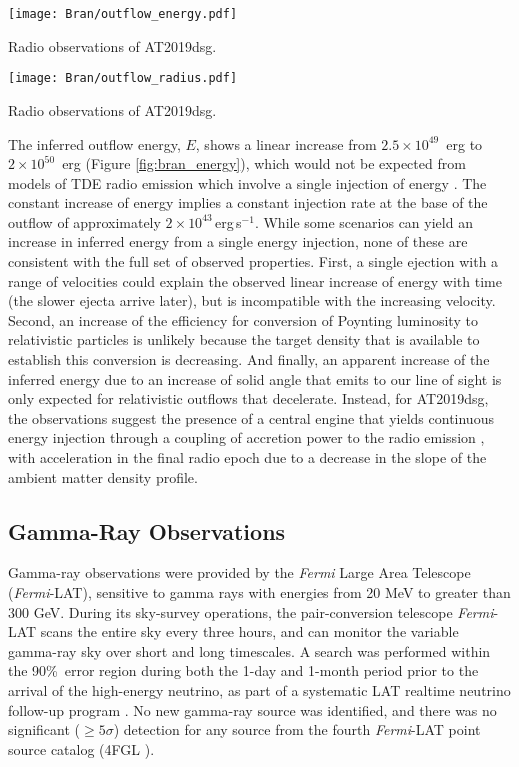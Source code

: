 \begin{marginfigure}
	\texttt{[image: Bran/outflow\_energy.pdf]}
	\caption{Radio observations of AT2019dsg.}
	\label{fig:bran_energy}
\end{marginfigure}

\begin{marginfigure}
	\texttt{[image: Bran/outflow\_radius.pdf]}
	\caption{Radio observations of AT2019dsg.}
	\label{fig:bran_radius}
\end{marginfigure}

The inferred outflow energy, $E$, shows a linear increase from $2.5 \times 10^{49}$~erg to $2 \times 10^{50}$~erg (Figure \ref{fig:bran_energy}), which would not be expected from models of TDE radio emission which involve a single injection of energy . The constant increase of energy implies a constant injection rate at the base of the outflow of approximately $2\times10^{43}$\,erg\,s$^{-1}$. While some scenarios can yield an increase in inferred energy from a single energy injection, none of these are consistent with the full set of observed properties. First, a single ejection with a range of velocities could explain the observed linear increase of energy with time (the slower ejecta arrive later), but is incompatible with the increasing velocity. Second, an increase of the efficiency for conversion of Poynting luminosity to relativistic particles is unlikely because the target density that is available to establish this conversion is decreasing.  And finally, an apparent increase of the inferred energy due to an increase of solid angle that emits to our line of sight is only expected for relativistic outflows that decelerate. Instead, for AT2019dsg, the observations suggest the presence of a central engine that yields continuous energy injection through a coupling of accretion power to the radio emission \cite{2018ApJ...856....1P}, with acceleration in the final radio epoch due to a decrease in the slope of the ambient matter density profile. 

\subsection*{Gamma-Ray Observations}

Gamma-ray observations were provided by the %
\textit{Fermi} Large Area Telescope (\textit{Fermi}-LAT)\cite{2009ApJ...697.1071A}, sensitive to gamma rays with energies from 20 MeV to greater than 300 GeV. During its sky-survey operations, the pair-conversion telescope \textit{Fermi}-LAT scans the entire sky every three hours, and can monitor the variable gamma-ray sky over short and long timescales. A search was performed within the 90\%\ error region during both the 1-day and 1-month period prior to the arrival of the high-energy neutrino, as part of a systematic LAT realtime neutrino follow-up program . No new gamma-ray source was identified, and there was no significant ($\geq 5 \sigma$) detection for any source from the fourth \textit{Fermi}-LAT point source catalog (4FGL ).

